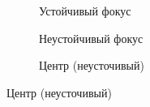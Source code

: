 \begin{figure}[H]
  \centering

  \begin{subfigure}[b]{0.3\textwidth}
    
    \caption{Устойчивый фокус}

  \end{subfigure}
  \qquad
  \begin{subfigure}[b]{0.3\textwidth}

    
    \caption{Неустойчивый фокус}

  \end{subfigure}
  \qquad
  \begin{subfigure}[b]{0.3\textwidth}

    
    \caption{Центр (неусточивый)}

  \end{subfigure}
\end{figure}